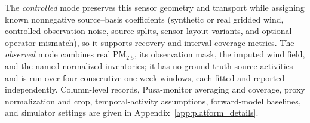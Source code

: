 The \emph{controlled} mode preserves this sensor geometry and transport while
assigning known nonnegative source--basis coefficients (synthetic or real gridded
wind, controlled observation noise, source splits, sensor-layout variants, and
optional operator mismatch), so it supports recovery and interval-coverage
metrics.  The \emph{observed} mode combines real PM\(_{2.5}\), its observation
mask, the imputed wind field, and the named normalized inventories; it has no
ground-truth source activities and is run over four consecutive one-week windows,
each fitted and reported independently.  Column-level records, Pusa-monitor
averaging and coverage, proxy normalization and crop, temporal-activity
assumptions, forward-model baselines, and simulator settings are given in
Appendix~\ref{app:platform_details}.\\
